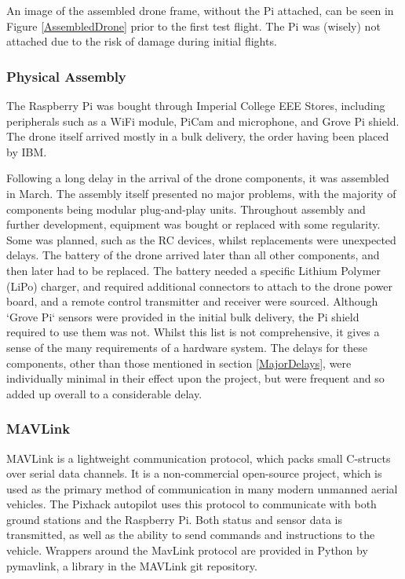 \documentclass{article}
\begin{document}
An image of the assembled drone frame, without the Pi attached, can be seen in Figure \ref{AssembledDrone} prior to the first test flight. The Pi was (wisely) not attached due to the risk of damage during initial flights.

\subsubsection{Physical Assembly}
The Raspberry Pi was bought through Imperial College EEE Stores, including peripherals such as a WiFi module, PiCam and microphone, and Grove Pi shield. The drone itself arrived mostly in a bulk delivery, the order having been placed by IBM. 

Following a long delay in the arrival of the drone components, it was assembled in March. The assembly itself presented no major problems, with the majority of components being modular plug-and-play units. Throughout assembly and further development, equipment was bought or replaced with some regularity. Some was planned, such as the RC devices, whilst replacements were unexpected delays. The battery of the drone arrived later than all other components, and then later had to be replaced. The battery needed a specific Lithium Polymer (LiPo) charger, and required additional connectors to attach to the drone power board, and a remote control transmitter and receiver were sourced. Although `Grove Pi` sensors were provided in the initial bulk delivery, the Pi shield required to use them was not. Whilst this list is not comprehensive, it gives a sense of the many requirements of a hardware system. The delays for these components, other than those mentioned in section \ref{MajorDelays}, were individually minimal in their effect upon the project, but were frequent and so added up overall to a considerable delay. 

\subsubsection{MAVLink}
MAVLink is a lightweight communication protocol, which packs small C-structs over serial data channels\cite{qGroundMavlink}. It is a non-commercial open-source project, which is used as the primary method of communication in many modern unmanned aerial vehicles. The Pixhack autopilot uses this protocol to communicate with both ground stations and the Raspberry Pi. Both status and sensor data is transmitted, as well as the ability to send commands and instructions to the vehicle. Wrappers around the MavLink protocol are provided in Python by pymavlink, a library in the MAVLink git repository.
\end{document}
